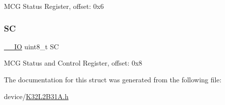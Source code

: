 M\+CG Status Register, offset\+: 0x6 \mbox{\label{struct_m_c_g___type_a369ca7d5284929a823dab79b7d10d81f}} 
\subsubsection{\texorpdfstring{SC}{SC}}
{\footnotesize\ttfamily \mbox{\hyperlink{core__cm0plus_8h_aec43007d9998a0a0e01faede4133d6be}{\+\_\+\+\_\+\+IO}} uint8\+\_\+t SC}

M\+CG Status and Control Register, offset\+: 0x8 

The documentation for this struct was generated from the following file\+:\begin{DoxyCompactItemize}
\item 
device/\mbox{\hyperlink{_k32_l2_b31_a_8h}{K32\+L2\+B31\+A.\+h}}\end{DoxyCompactItemize}
